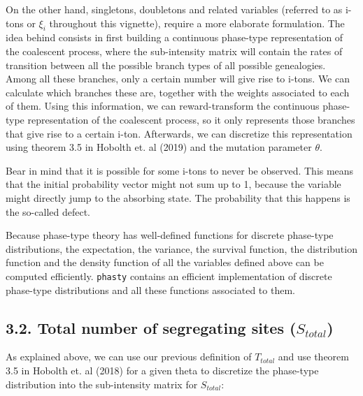 \documentclass[]{article}
\newenvironment{Shaded}{\begin{snugshade}}{\end{snugshade}}
\newcommand{\DecValTok}[1]{\textcolor[rgb]{0.00,0.00,0.81}{#1}}
\newcommand{\KeywordTok}[1]{\textcolor[rgb]{0.13,0.29,0.53}{\textbf{#1}}}
\newcommand{\NormalTok}[1]{#1}
\newcommand{\OperatorTok}[1]{\textcolor[rgb]{0.81,0.36,0.00}{\textbf{#1}}}
\newcommand{\StringTok}[1]{\textcolor[rgb]{0.31,0.60,0.02}{#1}}
\begin{document}
On the other hand, singletons, doubletons and related variables
(referred to as i-tons or \(\xi_i\) throughout this vignette), require a
more elaborate formulation. The idea behind consists in first building a
continuous phase-type representation of the coalescent process, where
the sub-intensity matrix will contain the rates of transition between
all the possible branch types of all possible genealogies. Among all
these branches, only a certain number will give rise to i-tons. We can
calculate which branches these are, together with the weights associated
to each of them. Using this information, we can reward-transform the
continuous phase-type representation of the coalescent process, so it
only represents those branches that give rise to a certain i-ton.
Afterwards, we can discretize this representation using theorem 3.5 in
Hobolth et. al (2019) and the mutation parameter \(\theta\).

Bear in mind that it is possible for some i-tons to never be observed.
This means that the initial probability vector might not sum up to 1,
because the variable might directly jump to the absorbing state. The
probability that this happens is the so-called defect.

Because phase-type theory has well-defined functions for discrete
phase-type distributions, the expectation, the variance, the survival
function, the distribution function and the density function of all the
variables defined above can be computed efficiently. \texttt{phasty}
contains an efficient implementation of discrete phase-type
distributions and all these functions associated to them.

\hypertarget{total-number-of-segregating-sites-s_total}{%
\subsection{\texorpdfstring{3.2. Total number of segregating sites
(\(S_{total}\))}{3.2. Total number of segregating sites (S\_\{total\})}}\label{total-number-of-segregating-sites-s_total}}

As explained above, we can use our previous definition of \(T_{total}\)
and use theorem 3.5 in Hobolth et. al (2018) for a given theta to
discretize the phase-type distribution into the sub-intensity matrix for
\(S_{total}\):

\begin{Shaded}
\end{Shaded}
\end{document}
